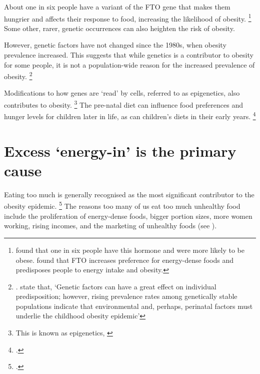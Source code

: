 \documentclass[embargoed]{grattan}
\begin{document}
About one in six people have a variant of the FTO gene that makes them hungrier and affects their response to food, increasing the likelihood of obesity.%
\footnote{\textcite{Frayling2007commonvariantFTO} found that one in six people have this hormone and were more likely to be obese. \textcite{Karra2013linkFTOghrelin} found that FTO increases preference for energy-dense foods and predisposes people to energy intake and obesity.} Some other, rarer, genetic occurrences can also heighten the risk of obesity.

However, genetic factors have not changed since the 1980s, when obesity prevalence increased.
This suggests that while genetics is a contributor to obesity for some people, it is not a population-wide reason for the increased prevalence of obesity.%
\footnote{\textcite{Karra2013linkFTOghrelin}. \textcite{Ebbeling2002Childhoodobesitypublic} state that, `Genetic factors can have a great effect on individual predisposition; however, rising prevalence rates among genetically stable populations indicate that environmental and, perhaps, perinatal factors must underlie the childhood obesity epidemic'}

Modifications to how genes are `read' by cells, referred to as epigenetics, also contributes to obesity.%
\footnote{This is known as epigenetics, \textcite{Australia2014NoTimeWeight}} The pre-natal diet can influence food preferences and hunger levels for children later in life, as can children's diets in their early years.%
\footcites{Li2010Epigeneticprogrammingmaternal}{Ebbeling2002Childhoodobesitypublic}

\section{Excess `energy-in' is the primary cause}\label{excess-energy-in-is-the-primary-cause}

Eating too much is generally recognised as the most significant contributor to the obesity epidemic.%
\footcites{Finkelstein2010EconomicsObesity}{Organisation2000Obesitypreventingmanaging}{Bray2004Consumptionhighfructose}{Ewart-Pierce2016WholeCommunityObesity}{Karnani2016ObesityCrisisas}{Livingston2012JAMAobesitytheme}{Roberto2015Patchyprogressobesity}{Tataranni2003Bodyweightgain}{Stunkard1999Energyintakenot}{Swinburn2006Estimatingeffectsenergy}{Drewnowski2005economicsobesitydietary} The reasons too many of us eat too much unhealthy food include the proliferation of energy-dense foods, bigger portion sizes, more women working, rising incomes, and the marketing of unhealthy foods (see ).
\end{document}
